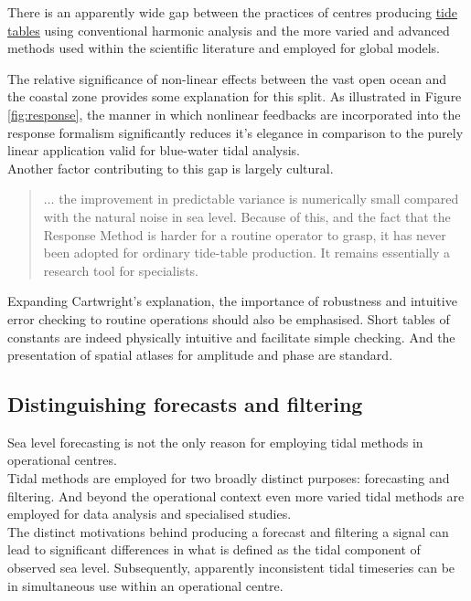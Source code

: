 There is an apparently wide gap between the practices of centres producing \underline{tide tables} using conventional harmonic analysis and the more varied and advanced methods used within the scientific literature and employed for global models.


The relative significance of non-linear effects between the vast open ocean and the coastal zone provides some explanation for this split.  As illustrated in Figure \ref{fig:response}, the manner in which nonlinear feedbacks are incorporated into the response formalism significantly reduces it's elegance in comparison to the purely linear application valid for blue-water tidal analysis.\\
Another factor contributing to this gap is largely cultural.
\begin{quotation}
$\dots$ the improvement in predictable variance is numerically small compared with the natural noise in sea level.   Because of this, and the fact that the Response Method is harder for a routine operator to grasp, it has never been adopted for ordinary tide-table production. It remains essentially a research tool for specialists. \citep[pp 198]{Cartwright:2000tt} 
\end{quotation}
Expanding Cartwright's explanation, the importance of robustness and intuitive error checking to routine operations should also be emphasised.  Short tables of constants are indeed physically intuitive and facilitate simple checking.   And the presentation of spatial atlases for amplitude and phase are standard.





\subsection{Distinguishing forecasts and filtering}

Sea level forecasting is not the only reason for employing tidal methods in operational centres.\\
Tidal methods are employed for two broadly distinct purposes: forecasting and filtering.  And beyond the operational context even more varied tidal methods are employed for data analysis and specialised studies.\\

The distinct motivations behind producing a forecast and filtering a signal can lead to significant differences in what is defined as the tidal component of observed sea level.   Subsequently, apparently inconsistent tidal timeseries can be in simultaneous use within an operational centre.



